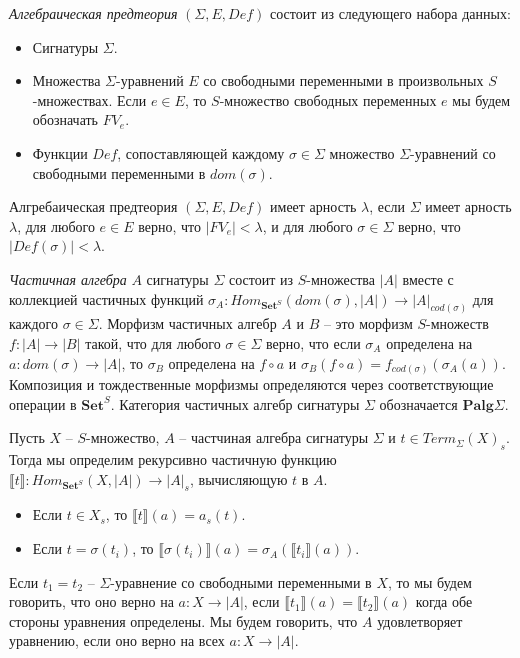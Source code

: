 \documentclass{amsart}
\theoremstyle{definition}
\theoremstyle{remark}
\renewcommand{\ll}{\llbracket}
\newcommand{\rr}{\rrbracket}
\newcommand{\cat}[1]{\mathbf{#1}}
\newcommand{\Set}{\cat{Set}}
\numberwithin{figure}{section}
\begin{document}
\begin{defn}
\emph{Алгебраическая предтеория} $(\Sigma, E, Def)$ состоит из следующего набора данных:
\begin{itemize}
\item Сигнатуры $\Sigma$.
\item Множества $\Sigma$-уравнений $E$ со свободными переменными в произвольных $S$-множествах.
    Если $e \in E$, то $S$-множество свободных переменных $e$ мы будем обозначать $FV_e$.
\item Функции $Def$, сопоставляющей каждому $\sigma \in \Sigma$ множество $\Sigma$-уравнений со свободными переменными в $dom(\sigma)$.
\end{itemize}
\end{defn}
Алгребаическая предтеория $(\Sigma, E, Def)$ имеет арность $\lambda$, если $\Sigma$ имеет арность $\lambda$, для любого $e \in E$ верно, что $|FV_e| < \lambda$, и для любого $\sigma \in \Sigma$ верно, что $|Def(\sigma)| < \lambda$.

\emph{Частичная алгебра} $A$ сигнатуры $\Sigma$ состоит из $S$-множества $|A|$ вместе с коллекцией частичных функций $\sigma_A : Hom_{\Set^S}(dom(\sigma), |A|) \to |A|_{cod(\sigma)}$ для каждого $\sigma \in \Sigma$.
Морфизм частичных алгебр $A$ и $B$ -- это морфизм $S$-множеств $f : |A| \to |B|$ такой, что для любого $\sigma \in \Sigma$ верно, что если $\sigma_A$ определена на $a : dom(\sigma) \to |A|$, то $\sigma_B$ определена на $f \circ a$ и $\sigma_B(f \circ a) = f_{cod(\sigma)}(\sigma_A(a))$.
Композиция и тождественные морфизмы определяются через соответствующие операции в $\Set^S$.
Категория частичных алгебр сигнатуры $\Sigma$ обозначается $\cat{Palg}\Sigma$.

Пусть $X$ -- $S$-множество, $A$ -- частчиная алгебра сигнатуры $\Sigma$ и $t \in Term_\Sigma(X)_s$.
Тогда мы определим рекурсивно частичную функцию $\ll t \rr : Hom_{\Set^S}(X, |A|) \to |A|_s$, вычисляющую $t$ в $A$.
\begin{itemize}
\item Если $t \in X_s$, то $\ll t \rr(a) = a_s(t)$.
\item Если $t = \sigma(t_i)$, то $\ll \sigma(t_i) \rr(a) = \sigma_A(\ll t_i \rr(a))$.
\end{itemize}
Если $t_1 = t_2$ -- $\Sigma$-уравнение со свободными переменными в $X$, то мы будем говорить, что оно верно на $a : X \to |A|$, если $\ll t_1 \rr(a) = \ll t_2 \rr(a)$ когда обе стороны уравнения определены.
Мы будем говорить, что $A$ удовлетворяет уравнению, если оно верно на всех $a : X \to |A|$.
\end{document}
